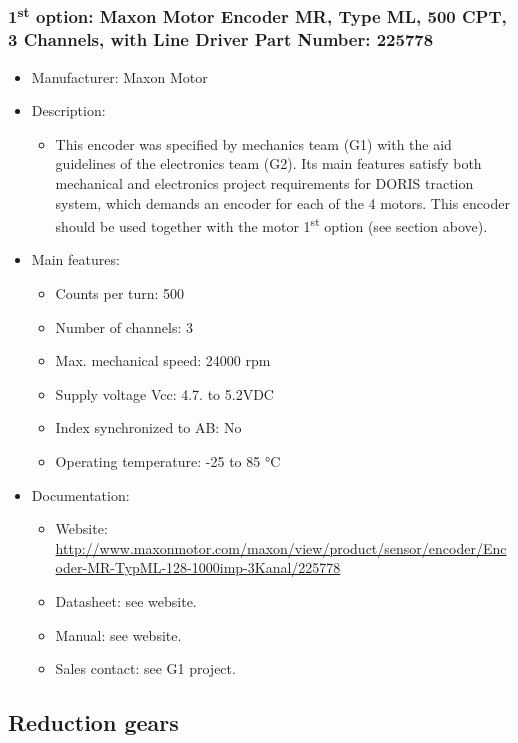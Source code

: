 \subsubsection{1\textsuperscript{st} option: Maxon Motor Encoder MR, Type ML, 500 CPT, 3 Channels, with Line Driver Part Number: 225778} \label{DEVICE:ENCODER1}
\begin{itemize}
  \item Manufacturer: Maxon Motor
  \item Description:
  \begin{itemize}
    \item This encoder was specified by mechanics team (G1) with the aid guidelines of the electronics team (G2). Its main features satisfy both mechanical and electronics project requirements for DORIS traction system, which demands an encoder for each of the 4 motors. This encoder should be used together with the motor 1\textsuperscript{st} option (see section above).
  \end{itemize}
  \item Main features:
  \begin{itemize}
    \item Counts per turn: 500
    \item Number of channels: 3
    \item Max. mechanical speed: 24000 rpm
    \item Supply voltage Vcc: 4.7. to 5.2VDC
    \item Index synchronized to AB: No
    \item Operating temperature: -25 to 85 °C
  \end{itemize}
  \item Documentation:
  \begin{itemize}
    \item Website: \href{http://www.maxonmotor.com/maxon/view/product/sensor/encoder/Encoder-MR-TypML-128-1000imp-3Kanal/225778}{http://www.maxonmotor.com/maxon/view/product/sensor/encoder/Encoder-MR-TypML-128-1000imp-3Kanal/225778}
    \item Datasheet: see website.
    \item Manual: see website.
    \item Sales contact: see G1 project.
  \end{itemize}
\end{itemize}
\subsection{Reduction gears}
